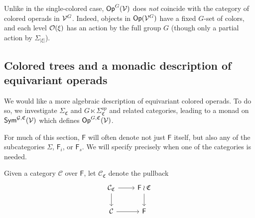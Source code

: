 \documentclass[a4paper,10pt
,draft
]{article}%
\renewcommand{\1}{\eta}%
\newcommand{\SC}{\Sigma_{\mathfrak C}}
\begin{document}
\begin{remark}
	Unlike in the single-colored case, $\mathsf{Op}^G(\mathcal V)$ does \textit{not} coincide with the category of colored operads in $\mathcal V^G$.
	Indeed, objects in $\mathsf{Op}(\mathcal V^G)$ have a fixed $G$-set of colors,
        and each level $\mathcal{O}(\xi)$ has an action by the full group $G$
	(though only a partial action by $\Sigma_{|\xi|}$).
\end{remark}



\subsection{Colored trees and a monadic description of equivariant operads}
\label{COMEGA_SEC}


We would like a more algebraic description of equivariant colored operads.
To do so, we investigate $\SC$ and $G \ltimes \Sigma_{\mathfrak C}^{op}$ and related categories,
leading to a monad on $\mathsf{Sym}^{\mathcal{G}, \mathfrak C}(\mathcal V)$ which defines $\mathsf{Op}^{G, \mathfrak C}(\mathcal V)$.


\begin{remark}
      For much of this section, $\mathsf F$ will often denote not just $\mathsf F$ itself, but also any of the subcategories
      $\Sigma$, $\mathsf F_i$, or $\mathsf F_s$.
      We will specify precisely when one of the categories is needed.
\end{remark}

\begin{definition}
      Given a category $\mathcal C$ over $\mathsf F$, let $\mathcal C_{\mathfrak C}$ denote the pullback
      \begin{equation}
            \begin{tikzcd}
                  \mathcal C_{\mathfrak C} \arrow[r] \arrow[d]
                  &
                  \mathsf F \wr \mathfrak C \arrow[d]
                  \\
                  \mathcal C \arrow[r]
                  &
                  \mathsf F
            \end{tikzcd}
      \end{equation}
\end{definition}
\end{document}
